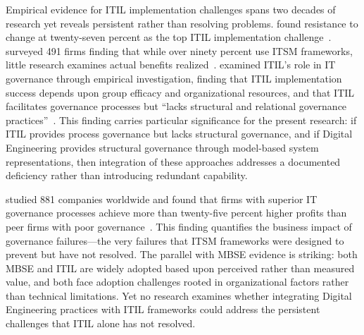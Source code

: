 Empirical evidence for ITIL implementation challenges spans two decades of research yet reveals persistent rather than resolving problems. \citeauthor{Cook_2021} found resistance to change at twenty-seven percent as the top ITIL implementation challenge~\parencite{Cook_2021}. \citeauthor{Marrone_Kolbe_2011} surveyed 491 firms finding that while over ninety percent use ITSM frameworks, little research examines actual benefits realized~\parencite{Marrone_Kolbe_2011}. \citeauthor{Iden_2014} examined ITIL's role in IT governance through empirical investigation, finding that ITIL implementation success depends upon group efficacy and organizational resources, and that ITIL facilitates governance processes but ``lacks structural and relational governance practices''~\parencite{Iden_2014}. This finding carries particular significance for the present research: if ITIL provides process governance but lacks structural governance, and if Digital Engineering provides structural governance through model-based system representations, then integration of these approaches addresses a documented deficiency rather than introducing redundant capability.

\citeauthor{Joshi_2022} studied 881 companies worldwide and found that firms with superior IT governance processes achieve more than twenty-five percent higher profits than peer firms with poor governance~\parencite{Joshi_2022}. This finding quantifies the business impact of governance failures---the very failures that ITSM frameworks were designed to prevent but have not resolved. The parallel with MBSE evidence is striking: both MBSE and ITIL are widely adopted based upon perceived rather than measured value, and both face adoption challenges rooted in organizational factors rather than technical limitations. Yet no research examines whether integrating Digital Engineering practices with ITIL frameworks could address the persistent challenges that ITIL alone has not resolved.

